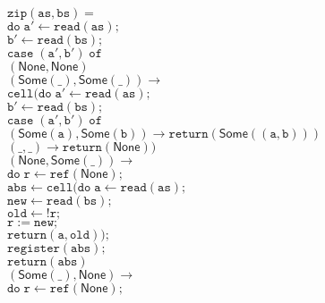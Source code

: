 \documentclass[preprint]{sigplanconf}
\newcommand{\term}[1]{\ensuremath{\mathtt{{#1}}}}
\newcommand{\None}{\mathsf{None}}
\newcommand{\Some}[1]{\mathsf{Some}({#1})}
\begin{document}
\begin{figure}
\begin{tabbing}
\term{zip(as, bs) =} \\
\;\;\= \term{do\;}\=\term{a' \leftarrow read(as);} \\
\>              \>\term{b' \leftarrow read(bs);} \\
\>              \>\term{case \;(a',b')\;of}\\ 
\>           \>\;\;\=\term{(\None, \None)} \\
\>           \>    \>\term{(\Some{\_}, \Some{\_}) \to} \\
\>           \>    \> \qquad \term{cell(do\;}\=\term{a' \leftarrow read(as);} \\
\>           \>    \>                      \>\term{b' \leftarrow read(bs);} \\
\>           \>    \>                      \>\term{case \;(a',b')\; of} \\
\>           \>    \>                      \>\;\;\=\term{(\Some{a}, \Some{b}) \to return(\Some{(a,b)})} \\
\>           \>    \>                      \>\;\;\=\term{(\_, \_) \to return(\None))} \\
\>           \>    \>\term{(\None, \Some{\_}) \to}\\
\>           \>    \> \qquad\term{do\;}\=
                                      \term{r \leftarrow ref(\None);} \\
\>           \>    \>               \>\term{abs \leftarrow cell(do\;}\=\term{a \leftarrow read(as);} \\
\>           \>    \>               \>                               \>\term{new \leftarrow read(bs);} \\
\>           \>    \>               \>                               \>\term{old \leftarrow !r;}\\
\>           \>    \>               \>                               \>\term{r := new;}\\
\>           \>    \>               \>                               \>\term{return(a,old));}\\
\>           \>    \>               \>\term{register(abs);} \\
\>           \>    \>               \>\term{return(abs)} \\
\>           \>    \>\term{(\Some{\_}, \None) \to}\\
\>           \>    \> \qquad\term{do\;}\=
                                      \term{r \leftarrow ref(\None);} \\

\end{tabbing}
\end{figure}
\end{document}
